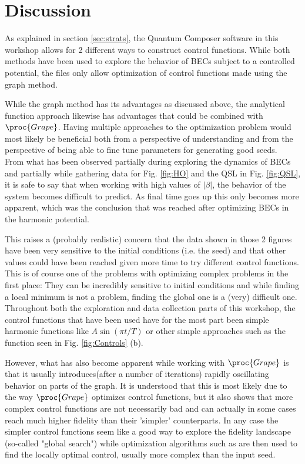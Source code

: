 \documentclass[a4paper, twocolumn]{revtex4-1}
\begin{document}
\section{Discussion}\label{sec:discussion}
As explained in section \ref{sec:strats}, the Quantum Composer software in this workshop allows for 2 different ways to construct control functions. While both methods have been used to explore the behavior of BECs subject to a controlled potential, the files only allow optimization of control functions made using the graph method.

While the graph method has its advantages as discussed above, the analytical function approach likewise has advantages that could be combined with $\proc{Grape}$. Having multiple approaches to the optimization problem would most likely be beneficial both from a perspective of understanding and from the perspective of being able to fine tune parameters for generating good seeds.\\

From what has been observed partially during exploring the dynamics of BECs and partially while gathering data for Fig. \ref{fig:HO} and the QSL in Fig. \ref{fig:QSL}, it is safe to say that when working with high values of $|\beta|$, the behavior of the system becomes difficult to predict. As final time goes up this only becomes more apparent, which was the conclusion that was reached after optimizing BECs in the harmonic potential.

This raises a (probably realistic) concern that the data shown in those 2 figures have been very sensitive to the initial conditions (i.e. the seed) and that other values could have been reached given more time to try different control functions. This is of course one of the problems with optimizing complex problems in the first place: They can be incredibly sensitive to initial conditions and while finding a local minimum is not a problem, finding the global one is a (very) difficult one.\\

Throughout both the exploration and data collection parts of this workshop, the control functions that have been used have for the most part been simple harmonic functions like $A\sin(\pi t/T)$ or other simple approaches such as the function seen in Fig. \ref{fig:Controls} (b).

However, what has also become apparent while working with $\proc{Grape}$ is that it usually introduces(after a number of iterations) rapidly oscillating behavior on parts of the graph. It is understood that this is most likely due to the way $\proc{Grape}$ optimizes control functions, but it also shows that more complex control functions are not necessarily bad and can actually in some cases reach much higher fidelity than their 'simpler' counterparts. In any case the simpler control functions seem like a good way to explore the fidelity landscape (so-called "global search") while optimization algorithms such as  are then used to find the locally optimal control, usually more complex than the input seed. \\
\end{document}
